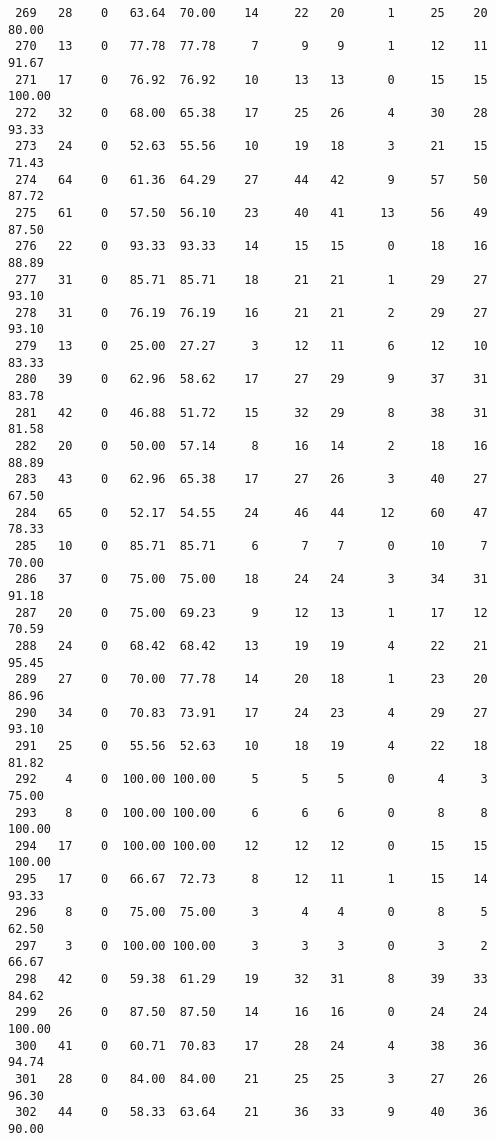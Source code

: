 \begin{verbatim}
 269   28    0   63.64  70.00    14     22   20      1     25    20    80.00
 270   13    0   77.78  77.78     7      9    9      1     12    11    91.67
 271   17    0   76.92  76.92    10     13   13      0     15    15   100.00
 272   32    0   68.00  65.38    17     25   26      4     30    28    93.33
 273   24    0   52.63  55.56    10     19   18      3     21    15    71.43
 274   64    0   61.36  64.29    27     44   42      9     57    50    87.72
 275   61    0   57.50  56.10    23     40   41     13     56    49    87.50
 276   22    0   93.33  93.33    14     15   15      0     18    16    88.89
 277   31    0   85.71  85.71    18     21   21      1     29    27    93.10
 278   31    0   76.19  76.19    16     21   21      2     29    27    93.10
 279   13    0   25.00  27.27     3     12   11      6     12    10    83.33
 280   39    0   62.96  58.62    17     27   29      9     37    31    83.78
 281   42    0   46.88  51.72    15     32   29      8     38    31    81.58
 282   20    0   50.00  57.14     8     16   14      2     18    16    88.89
 283   43    0   62.96  65.38    17     27   26      3     40    27    67.50
 284   65    0   52.17  54.55    24     46   44     12     60    47    78.33
 285   10    0   85.71  85.71     6      7    7      0     10     7    70.00
 286   37    0   75.00  75.00    18     24   24      3     34    31    91.18
 287   20    0   75.00  69.23     9     12   13      1     17    12    70.59
 288   24    0   68.42  68.42    13     19   19      4     22    21    95.45
 289   27    0   70.00  77.78    14     20   18      1     23    20    86.96
 290   34    0   70.83  73.91    17     24   23      4     29    27    93.10
 291   25    0   55.56  52.63    10     18   19      4     22    18    81.82
 292    4    0  100.00 100.00     5      5    5      0      4     3    75.00
 293    8    0  100.00 100.00     6      6    6      0      8     8   100.00
 294   17    0  100.00 100.00    12     12   12      0     15    15   100.00
 295   17    0   66.67  72.73     8     12   11      1     15    14    93.33
 296    8    0   75.00  75.00     3      4    4      0      8     5    62.50
 297    3    0  100.00 100.00     3      3    3      0      3     2    66.67
 298   42    0   59.38  61.29    19     32   31      8     39    33    84.62
 299   26    0   87.50  87.50    14     16   16      0     24    24   100.00
 300   41    0   60.71  70.83    17     28   24      4     38    36    94.74
 301   28    0   84.00  84.00    21     25   25      3     27    26    96.30
 302   44    0   58.33  63.64    21     36   33      9     40    36    90.00

\end{verbatim}
